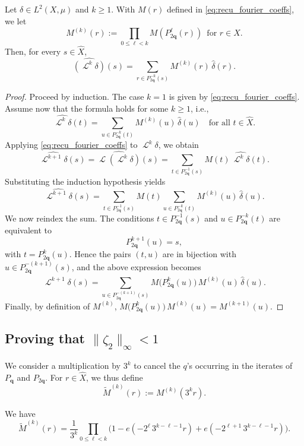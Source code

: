 \documentclass[12pt,reqno]{article}
\DeclareMathOperator{\Lop}{\mathcal{L}}
\begin{document}
\begin{lemma}
\label{lem:recu_fourier_coeffs_k_steps}
Let $\delta \in L^2(X,\mu)$ and $k \ge 1$. With $M(r)$ defined in \eqref{eq:recu_fourier_coeffs}, we let  
\[  M^{(k)}(r) := \prod_{0 \le \ell < k}
    M(P_{2\mathbf{q}}^\ell(r))
    \enspace 
    \text{for $r \in \widehat X$.}
\]
Then, for every $s \in \widehat X$,
\[  \widehat{(\Lop^k\delta)}(s) = 
    \sum_{r\in P_{2\mathbf{q}}^{-k}(s)}
    M^{(k)}(r) \, \hat\delta(r).
\]
\end{lemma}
\begin{proof}
Proceed by induction. The case $k=1$ is given by \eqref{eq:recu_fourier_coeffs}. Assume now that the formula holds for some $k\ge 1$, i.e.,
\[
\widehat{\Lop^k\delta}(t)
=
\sum_{u\in P_{2\mathbf{q}}^{-k}(t)} M^{(k)}(u)\,\widehat{\delta}(u)
\quad\text{for all } t\in\widehat X.
\]
Applying \eqref{eq:recu_fourier_coeffs} to $\Lop^k\delta$, we obtain
\[
\widehat{\Lop^{k+1}\delta}(s)=\widehat{\Lop(\Lop^{k}\delta)}(s)
=
\sum_{t\in P_{2\mathbf{q}}^{-1}(s)} M(t)\,\widehat{\Lop^k\delta}(t).
\]
Substituting the induction hypothesis yields
\[
\widehat{\Lop^{k+1}\delta}(s)
=
\sum_{t\in P_{2\mathbf{q}}^{-1}(s)} M(t)
\sum_{u\in P_{2\mathbf{q}}^{-k}(t)} M^{(k)}(u)\,\widehat{\delta}(u).
\]
We now reindex the sum.  
The conditions $t\in P_{2\mathbf{q}}^{-1}(s)$ and $u\in P_{2\mathbf{q}}^{-k}(t)$ are equivalent to
\[
P_{2\mathbf{q}}^{k+1}(u)=s,
\]
with $t=P_{2\mathbf{q}}^k(u)$. Hence the pairs $(t,u)$ are in bijection with
$u\in P_{2\mathbf{q}}^{-(k+1)}(s)$, and the above expression becomes
\[
\widehat{\Lop^{k+1}\delta}(s)
=
\sum_{u\in P_{2\mathbf{q}}^{-(k+1)}(s)}
M\!\big(P_{2\mathbf{q}}^k(u)\big)\,M^{(k)}(u)\,\widehat{\delta}(u).
\]
Finally, by definition of $M^{(k)}$,
\(
M\!\big(P_{2\mathbf{q}}^k(u)\big)\,M^{(k)}(u)=M^{(k+1)}(u)
\).
\end{proof}


\subsection{Proving that $\|\zeta_2\|_\infty < 1$}\label{sec:33}
We consider a multiplication by $3^k$ to cancel the $q$'s occurring in the iterates of $P_{\mathbf{q}}$ and $P_{2\mathbf{q}}$. For $r \in \widehat X$, we thus define
\begin{equation}
    \label{eq:defi_widetilde_M_k}
    \widetilde{M}^{(k)}(r) :=
    M^{(k)}(3^k r).
  \end{equation}
  \begin{lemma} We have 
\[     \widetilde{M}^{(k)}(r)=\frac{1}{3^k}
    \prod_{0 \le \ell < k}
    \bigl(1 - e(-2^\ell \, 3^{k-\ell-1} r) + e(-2^{\ell+1} \, 3^{k-\ell-1} r)\bigr).
  \]
\end{lemma}
\end{document}
